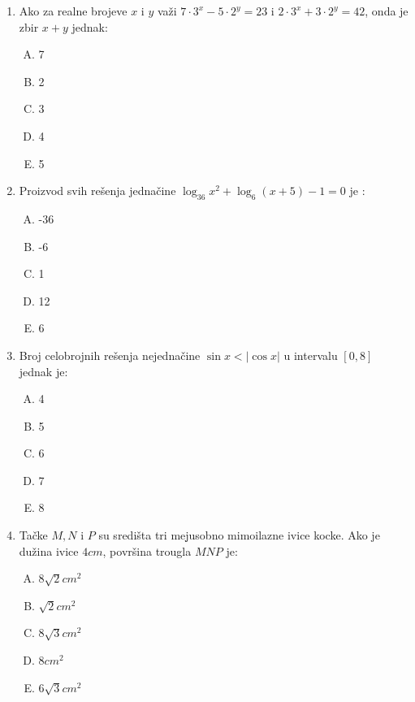 \documentclass[a4paper,12pt]{report}
\begin{document}
\begin{enumerate}[1.]
\item Ako za realne brojeve $x$  i $y$ va\v{z}i $7 \cdot 3^{x} - 5 \cdot 2^{y} = 23$ i $2 \cdot 3^{x} + 3 \cdot 2^{y} = 42$, onda je zbir $x + y$ jednak:
\begin{multicols}{5}
\begin{enumerate}[A)]
\item 7 \item 2 \item 3 \item 4 \item 5
\end{enumerate}
\end{multicols}


\item Proizvod svih re\v{s}enja jedna\v{c}ine $ \log_{36} x^{2} + \log_6 (x + 5) -1 = 0$ je :
\begin{multicols}{5}
\begin{enumerate}[A)]
\item -36 \item -6 \item 1 \item 12 \item 6
\end{enumerate}
\end{multicols}


\item Broj celobrojnih re\v{s}enja nejedna\v{c}ine $\sin{x} < \lvert \cos{x} \rvert $ u intervalu $[ 0,8] $ jednak je: 
\begin{multicols}{5}
\begin{enumerate}[A)]
\item 4 \item 5 \item 6 \item 7 \item 8
\end{enumerate}
\end{multicols}

\item Ta\v{c}ke $M,N$ i $P$ su sredi\v{s}ta tri me\d{j}usobno mimoilazne ivice kocke. Ako je du\v{z}ina ivice $4cm$, povr\v{s}ina trougla $MNP$ je:
\begin{multicols}{5}
\begin{enumerate}[A)]
\item $8\sqrt{2}cm^2$ \item $\sqrt{2}cm^2$ \item $8\sqrt{3}cm^2$ \item $8cm^2$ \item $6\sqrt{3}cm^2$
\end{enumerate}
\end{multicols}


\end{enumerate}
\end{document}
